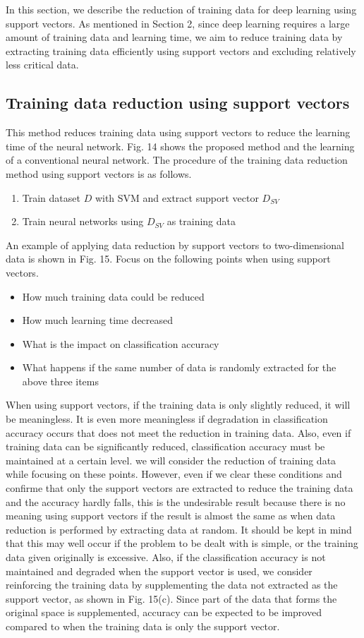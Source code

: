 In this section, we describe the reduction of training data for deep learning using support vectors. As mentioned in Section 2, since deep learning requires a large amount of training data and learning time, we aim to reduce training data by extracting training data efficiently using support vectors and excluding relatively less critical data. 

\subsection{Training data reduction using support vectors}
This method reduces training data using support vectors to reduce the learning time of the neural network. Fig. 14 shows the proposed method and the learning of a conventional neural network. The procedure of the training data reduction method using support vectors is as follows. 
\begin{enumerate}
\item Train dataset $D$ with SVM and extract support vector $D_{SV}$
\item Train neural networks using $D_{SV}$ as training data
\end{enumerate}
An example of applying data reduction by support vectors to two-dimensional data is shown in Fig. 15. Focus on the following points when using support vectors.
\begin{itemize}
\item How much training data could be reduced
\item How much learning time decreased
\item What is the impact on classification accuracy
\item What happens if the same number of data is randomly extracted for the above three items
\end{itemize}
When using support vectors, if the training data is only slightly reduced, it will be meaningless. It is even more meaningless if degradation in classification accuracy occurs that does not meet the reduction in training data. Also, even if training data can be significantly reduced, classification accuracy must be maintained at a certain level. we will consider the reduction of training data while focusing on these points. However, even if we clear these conditions and confirme that only the support vectors are extracted to reduce the training data and the accuracy hardly falls, this is the undesirable result because there is no meaning using support vectors if the result is almost the same as when data reduction is performed by extracting data at random. It should be kept in mind that this may well occur if the problem to be dealt with is simple, or the training data given originally is excessive. Also, if the classification accuracy is not maintained and degraded when the support vector is used, we consider reinforcing the training data by supplementing the data not extracted as the support vector, as shown in Fig. 15(c). Since part of the data that forms the original space is supplemented, accuracy can be expected to be improved compared to when the training data is only the support vector. 

